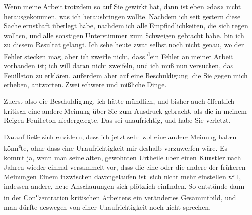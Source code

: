 \pstart
           Wenn meine Arbeit trotzdem so
               auf Sie gewirkt hat, dann ist eben »das« nicht herausgekommen, was ich herausbringen
               wollte. Nachdem ich seit gestern diese Sache ernsthaft
               überlegt habe, nachdem ich alle Empfindlichkeiten, die sich regen wollten, und alle
               sonstigen Unterstimmen zum Schweigen gebracht habe, bin ich zu diesem Resultat
               gelangt. Ich sehe heute zwar selbst noch nicht genau,
               wo der Fehler stecken mag, aber ich zweifle nicht, dass \substVorne{}\textsuperscript{d}\substDazwischen{}e\substHinten{}in Fehler an meiner Arbeit vorhanden ist; ich \uline{will} daran nicht
               zweifeln, und ich muß nun versuchen, das Feuilleton zu erklären, außerdem aber auf eine
               Beschuldigung, die Sie gegen mich erheben, antworten. Zwei schwere und  mißliche Dinge.\pend
           
\pstart
           Zuerst also die Beschuldigung\textcolor{gray}{,} ich hätte mündlich, und bisher auch
               öffentlich-kritisch eine andere Meinung über Sie zum Ausdruck gebracht, als die in
               meinem Reigen-Feuilleton
               niedergelegte. Das sei unaufrichtig, und habe Sie verletzt.\pend
           
\pstart
           Darauf ließe sich erwidern, dass ich jetzt sehr wol eine andere Meinung haben könn\substVorne{}\textsuperscript{e}\substDazwischen{}te\substHinten{}, ohne dass eine Unaufrichtigkeit mir deshalb vorzuwerfen wäre. Es kommt ja,
               wenn man seine alten, gewohnten Urtheile über einen Künstler nach Jahren wieder
               einmal versammelt \introOben{}vor\introOben{}, dass die eine oder die andere der
               früheren Meinungen Einem inzwischen davongelaufen ist, sich nicht mehr einstellen
               will, indessen andere, neue Anschauungen sich plötzlich einfinden. So entstünde dann
               in der Con\substVorne{}\textsuperscript{c}\substDazwischen{}z\substHinten{}entration kritischen Arbeitens ein verändertes Gesammtbild, und man dürfte
               deswegen von einer Unaufrichtigkeit noch nicht sprechen.\pend
           
